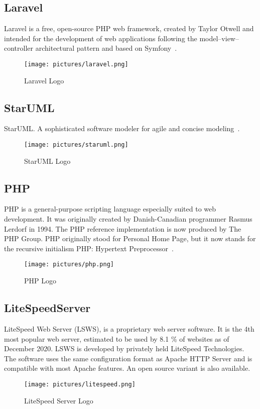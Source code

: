 \documentclass[12pt]{report}
\begin{document}
\subsection{Laravel}
Laravel is a free, open-source PHP web framework, created by Taylor Otwell and intended for the development of web applications following the model–view–controller architectural pattern and based on Symfony~\cite{laravel}.
\begin{figure}[!htbp]

        \centering
    \texttt{[image: pictures/laravel.png]}
    \caption{Laravel Logo}
    \label{fig:laravel}
\end{figure}


\subsection{StarUML}
StarUML. A sophisticated software modeler for agile and concise modeling~\cite{wong2007staruml}.
\begin{figure}[!htbp]

        \centering
    \texttt{[image: pictures/staruml.png]}
    \caption{StarUML Logo}
    \label{fig:staruml}
\end{figure}

\pagebreak
\subsection{PHP}
PHP is a general-purpose scripting language especially suited to web development. It was originally created by Danish-Canadian programmer Rasmus Lerdorf in 1994. The PHP reference implementation is now produced by The PHP Group. PHP originally stood for Personal Home Page, but it now stands for the recursive initialism PHP: Hypertext Preprocessor~\cite{welling2003php}.
\begin{figure}[!htbp]

        \centering
    \texttt{[image: pictures/php.png]}
    \caption{PHP Logo}
    \label{fig:php}
\end{figure}



\subsection{LiteSpeedServer}
LiteSpeed Web Server (LSWS), is a proprietary web server software. It is the 4th most popular web server, estimated to be used by 8.1 \% of websites as of December 2020. LSWS is developed by privately held LiteSpeed Technologies. The software uses the same configuration format as Apache HTTP Server and is compatible with most Apache features. An open source variant is also available.
\begin{figure}[!htbp]

        \centering
    \texttt{[image: pictures/litespeed.png]}
    \caption{LiteSpeed Server Logo}
    \label{fig:litespeed}
\end{figure}
\end{document}
